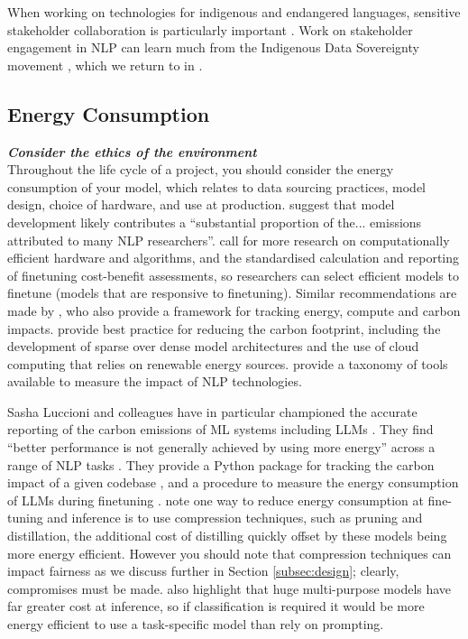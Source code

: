 When working on technologies for indigenous and endangered languages, sensitive stakeholder collaboration is particularly important \citep{bird_decolonising_2020, liu_not_2022, mahelona_openais_2023}. Work on stakeholder engagement in NLP can learn much from the Indigenous Data Sovereignty movement \citep{sloane_participation_2022}, which we return to in . 

\subsection{Energy Consumption}\label{subsec:energy}
\noindent\textbf{\textit{Consider the ethics of the environment}}\\

\noindent Throughout the life cycle of a project, you should consider the energy consumption of your model, which relates to data sourcing practices, model design, choice of hardware, and use at production. \citet{strubell_energy_2019} suggest that model development likely contributes a ``substantial proportion of the... emissions attributed to many NLP researchers''. 
\citet{strubell_energy_2019} call for more research on computationally efficient hardware and algorithms, and the standardised calculation and reporting of finetuning cost-benefit assessments, so researchers can select efficient models to finetune (models that are responsive to finetuning).
Similar recommendations are made by \citet{henderson_towards_2020}, who also provide a framework for tracking energy, compute and carbon impacts. 
\citet{patterson_carbon_2022} provide best practice for reducing the carbon footprint, including the development of sparse over dense model architectures and the use of cloud computing that relies on renewable energy sources. 
\citet{bannour_evaluating_2021} provide a taxonomy of tools available to measure the impact of NLP technologies. 

Sasha Luccioni and colleagues have in particular championed the accurate reporting of the carbon emissions of ML systems including LLMs \citep{luccioni_estimating_2023, luccioni_counting_2023, wang_energy_2023, luccioni_power_2024, dodge_measuring_2022, lacoste_quantifying_2019}. 
They find ``better performance is not generally achieved by using more energy'' across a range of NLP tasks \citep{luccioni_counting_2023}. 
They provide a Python package for tracking the carbon impact of a given codebase \citep{courty_mlco2codecarbon_2024}, and a procedure to measure the energy consumption of LLMs during finetuning \cite{wang_energy_2023}. 
\citet{wang_energy_2023} note one way to reduce energy consumption at fine-tuning and inference is to use compression techniques, such as pruning and distillation, the additional cost of distilling quickly offset by these models being more energy efficient. However you should note that compression techniques can impact fairness as we discuss further in Section \cref{subsec:design}; clearly, compromises must be made. \citet{luccioni_power_2024} also highlight that huge multi-purpose models have far greater cost at inference, so if classification is required it would be more energy efficient to use a task-specific model than rely on prompting. 

